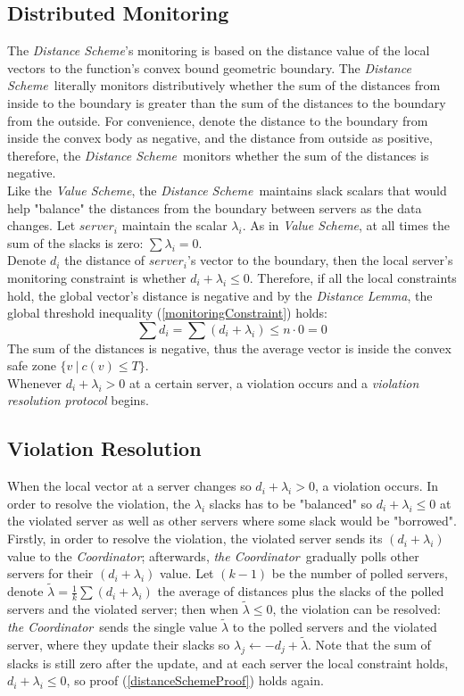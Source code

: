 \documentclass[10pt, conference]{IEEEtran}
\newcommand{\valueScheme}{\textit{Value Scheme}}
\newcommand{\distanceScheme}{\textit{Distance Scheme}}
\newcommand{\distanceLemma}{\textit{Distance Lemma}}
\newcommand{\theCoordinator}{\textit{the Coordinator}}
\newcommand{\Coordinator}{\textit{Coordinator}}
\begin{document}
\subsection{Distributed Monitoring}
The \distanceScheme 's monitoring is based on the distance value of the local vectors to the function's convex bound geometric boundary. The \distanceScheme \ literally monitors distributively whether the sum of the distances from inside to the boundary is greater than the sum of the distances to the boundary from the outside. For convenience, denote the distance to the boundary from inside the convex body as negative, and the distance from outside as positive, therefore, the \distanceScheme \ monitors whether the sum of the distances is negative. \\
Like the \valueScheme , the \distanceScheme \ maintains slack scalars that would help "balance" the distances from the boundary between servers as the data changes. Let $server_i$ maintain the scalar $\lambda _i$. As in \valueScheme , at all times the sum of the slacks is zero: ${\sum {\lambda _i} = 0}$. \\
Denote $d_i$ the distance of $server_i$'s vector to the boundary, then the local server's monitoring constraint is whether ${d_i + \lambda_i \leq 0}$. Therefore, if all the local constraints hold, the global vector's distance is negative and by the \distanceLemma , the global threshold inequality (\ref{monitoringConstraint}) holds:
\begin{equation}
\label{distanceSchemeProof}
\sum{d_i} = \sum{(d_i + \lambda _i)} \leq n \cdot 0 = 0
\end{equation}
The sum of the distances is negative, thus the average vector is inside the convex safe zone ${\{v \ | \ c(v) \leq T \}}$. \\
Whenever ${d_i + \lambda _i > 0}$ at a certain server, a violation occurs and a  \textit{violation resolution protocol} begins. 
\subsection{Violation Resolution}
When the local vector at a server changes so ${d_i + \lambda _i > 0}$, a violation occurs. In order to resolve the violation, the $\lambda _i$ slacks has to be "balanced" so ${d_i + \lambda _i \leq 0}$ at the violated server as well as other servers where some slack would be "borrowed". \\
Firstly, in order to resolve the violation, the violated server sends its ${(d_i + \lambda _i)}$ value to the \Coordinator ; afterwards, \theCoordinator \ gradually polls other servers for their ${(d_i + \lambda _i)}$ value. Let $(k-1)$ be the number of polled servers, denote ${\widetilde{\lambda} = \frac{1}{k}\sum(d_i + \lambda _i)}$ the average of distances plus the slacks of the polled servers and the violated server; then when ${\widetilde{\lambda} \leq 0}$, the violation can be resolved: \theCoordinator \ sends the single value $\widetilde{\lambda}$ to the polled servers and the violated server, where they update their slacks so ${\lambda _j 
\leftarrow -d_j + \widetilde{\lambda}}$. Note that the sum of slacks is still zero after the update, and at each server the local constraint holds, ${d_i + \lambda _i \leq 0}$, so proof (\ref{distanceSchemeProof}) holds again.
\end{document}
